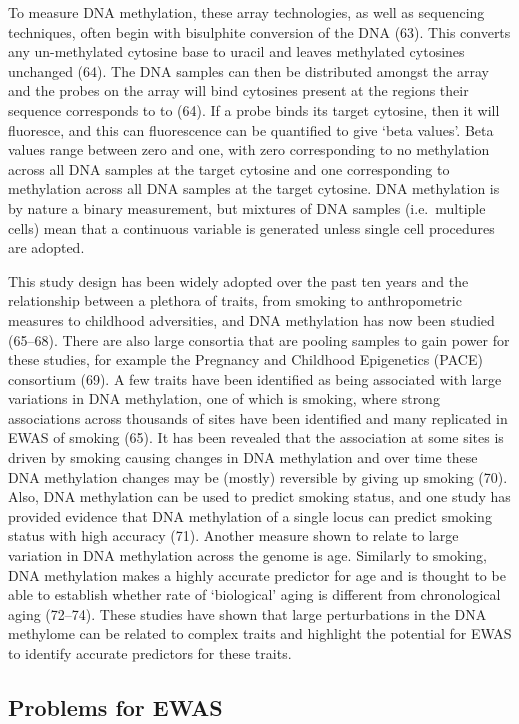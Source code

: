 \documentclass[11pt,oneside]{bristolthesis}
\begin{document}
To measure DNA methylation, these array technologies, as well as sequencing techniques, often begin with bisulphite conversion of the DNA (63). This converts any un-methylated cytosine base to uracil and leaves methylated cytosines unchanged (64). The DNA samples can then be distributed amongst the array and the probes on the array will bind cytosines present at the regions their sequence corresponds to to (64). If a probe binds its target cytosine, then it will fluoresce, and this can fluorescence can be quantified to give `beta values'. Beta values range between zero and one, with zero corresponding to no methylation across all DNA samples at the target cytosine and one corresponding to methylation across all DNA samples at the target cytosine. DNA methylation is by nature a binary measurement, but mixtures of DNA samples (i.e.~multiple cells) mean that a continuous variable is generated unless single cell procedures are adopted.

This study design has been widely adopted over the past ten years and the relationship between a plethora of traits, from smoking to anthropometric measures to childhood adversities, and DNA methylation has now been studied (65--68). There are also large consortia that are pooling samples to gain power for these studies, for example the Pregnancy and Childhood Epigenetics (PACE) consortium (69). A few traits have been identified as being associated with large variations in DNA methylation, one of which is smoking, where strong associations across thousands of sites have been identified and many replicated in EWAS of smoking (65). It has been revealed that the association at some sites is driven by smoking causing changes in DNA methylation and over time these DNA methylation changes may be (mostly) reversible by giving up smoking (70). Also, DNA methylation can be used to predict smoking status, and one study has provided evidence that DNA methylation of a single locus can predict smoking status with high accuracy (71). Another measure shown to relate to large variation in DNA methylation across the genome is age. Similarly to smoking, DNA methylation makes a highly accurate predictor for age and is thought to be able to establish whether rate of `biological' aging is different from chronological aging (72--74). These studies have shown that large perturbations in the DNA methylome can be related to complex traits and highlight the potential for EWAS to identify accurate predictors for these traits.

\hypertarget{problems-for-ewas}{%
\subsection{Problems for EWAS}\label{problems-for-ewas}}
\end{document}
